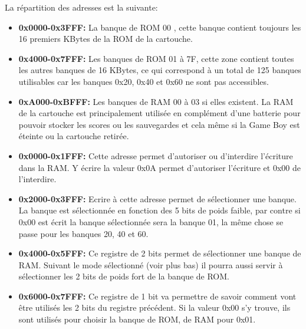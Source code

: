 \documentclass[french]{report}
\begin{document}
La répartition des adresses est la suivante:\\
\begin{itemize}
\item \textbf{0x0000-0x3FFF:} La banque de ROM 00 , cette banque contient toujours les 16 premiers KBytes de la ROM de la cartouche.\\
\item \textbf{0x4000-0x7FFF:} Les banques de ROM 01 à 7F, cette zone contient toutes les autres banques de 16 KBytes, ce qui correspond à un total de 125 banques utilisables car les banques 0x20, 0x40 et 0x60 ne sont pas accessibles.\\
\item \textbf{0xA000-0xBFFF:} Les banques de RAM 00 à 03 si elles existent. La RAM de la cartouche est principalement utilisée en complément d'une batterie pour pouvoir stocker les scores ou les sauvegardes et cela même si la Game Boy est éteinte ou la cartouche retirée.\\
\item \textbf{0x0000-0x1FFF:} Cette adresse permet d'autoriser ou d'interdire l'écriture dans la RAM. Y écrire la valeur 0x0A permet d'autoriser l'écriture et 0x00 de l'interdire.\\
\item \textbf{0x2000-0x3FFF:} Ecrire à cette adresse permet de sélectionner une banque. La banque est sélectionnée en fonction des 5 bits de poids faible, par contre si 0x00 est écrit la banque sélectionnée sera la banque 01, la même chose se passe pour les banques 20, 40 et 60.\\
\item \textbf{0x4000-0x5FFF:} Ce registre de 2 bits permet de sélectionner une banque de RAM. Suivant le mode sélectionné (voir plus bas) il pourra aussi servir à sélectionner les 2 bits de poids fort de la banque de ROM.\\
\item \textbf{0x6000-0x7FFF:} Ce registre de 1 bit va permettre de savoir comment vont être utilisés les 2 bits du registre précédent. Si la valeur 0x00 s'y trouve, ils sont utilisés pour choisir la banque de ROM, de RAM pour 0x01.\\
\end{itemize}
\end{document}
